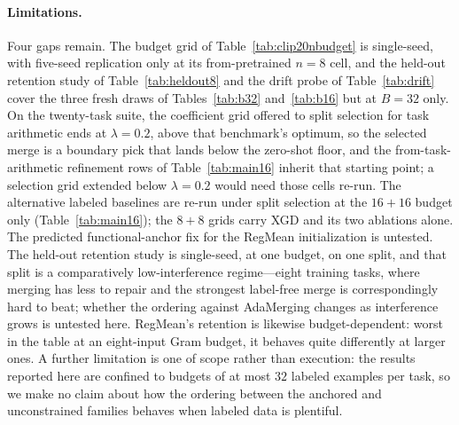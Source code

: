 \documentclass{article} %
\begin{document}
\paragraph{Limitations.}
Four gaps remain. The budget grid of Table~\ref{tab:clip20nbudget} is single-seed, with five-seed replication only at its from-pretrained $n=8$ cell, and the held-out retention study of Table~\ref{tab:heldout8} and the drift probe of Table~\ref{tab:drift} cover the three fresh draws of Tables~\ref{tab:b32} and~\ref{tab:b16} but at $B=32$ only. On the twenty-task suite, the coefficient grid offered to split selection for task arithmetic ends at $\lambda=0.2$, above that benchmark's optimum, so the selected merge is a boundary pick that lands below the zero-shot floor, and the from-task-arithmetic refinement rows of Table~\ref{tab:main16} inherit that starting point; a selection grid extended below $\lambda=0.2$ would need those cells re-run. The alternative labeled baselines are re-run under split selection at the $16{+}16$ budget only (Table~\ref{tab:main16}); the $8{+}8$ grids carry XGD and its two ablations alone. The predicted functional-anchor fix for the RegMean initialization is untested. The held-out retention study is single-seed, at one budget, on one split, and that split is a comparatively low-interference regime---eight training tasks, where merging has less to repair and the strongest label-free merge is correspondingly hard to beat; whether the ordering against AdaMerging changes as interference grows is untested here. RegMean's retention is likewise budget-dependent: worst in the table at an eight-input Gram budget, it behaves quite differently at larger ones. A further limitation is one of scope rather than execution: the results reported here are confined to budgets of at most $32$ labeled examples per task, so we make no claim about how the ordering between the anchored and unconstrained families behaves when labeled data is plentiful.
\end{document}
